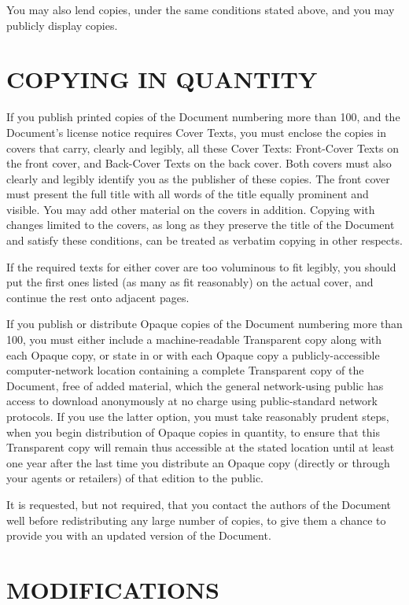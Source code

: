 You may also lend copies, under the same conditions stated above, and
you may publicly display copies.

\section{COPYING IN QUANTITY}\label{gfdl-3}

If you publish printed copies of the Document numbering more than 100,
and the Document's license notice requires Cover Texts, you must enclose
the copies in covers that carry, clearly and legibly, all these Cover
Texts: Front-Cover Texts on the front cover, and Back-Cover Texts on the
back cover. Both covers must also clearly and legibly identify you as
the publisher of these copies. The front cover must present the full
title with all words of the title equally prominent and visible. You may
add other material on the covers in addition. Copying with changes
limited to the covers, as long as they preserve the title of the
Document and satisfy these conditions, can be treated as verbatim
copying in other respects.

If the required texts for either cover are too voluminous to fit
legibly, you should put the first ones listed (as many as fit
reasonably) on the actual cover, and continue the rest onto adjacent
pages.

If you publish or distribute Opaque copies of the Document numbering
more than 100, you must either include a machine-readable Transparent
copy along with each Opaque copy, or state in or with each Opaque copy a
publicly-accessible computer-network location containing a complete
Transparent copy of the Document, free of added material, which the
general network-using public has access to download anonymously at no
charge using public-standard network protocols. If you use the latter
option, you must take reasonably prudent steps, when you begin
distribution of Opaque copies in quantity, to ensure that this
Transparent copy will remain thus accessible at the stated location
until at least one year after the last time you distribute an Opaque
copy (directly or through your agents or retailers) of that edition to
the public.

It is requested, but not required, that you contact the authors of the
Document well before redistributing any large number of copies, to give
them a chance to provide you with an updated version of the Document.

\section{MODIFICATIONS}\label{gfdl-4}

